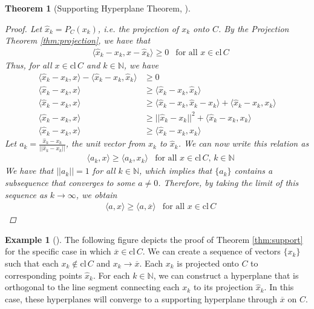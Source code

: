\documentclass[11pt,reqno]{amsart}
\newcommand{\N}{\mathbb{N}}
\newcommand{\cl}{\mathrm{cl\,}}
\theoremstyle{plain}
\newtheorem{maintheorem}{Theorem}
\theoremstyle{definition}
\newtheorem{example}[theorem]{Example}
\begin{document}
{\begin{maintheorem}[{Supporting Hyperplane Theorem, \cite[1.5.1]{bertsekas2009convex}}]
\begin{proof}
        Let $\hat{x}_k = P_C(x_k)$, \emph{i.e.} the projection of $x_k$ onto $C$. By the Projection Theorem \ref{thm:projection}, we have that
        \begin{align*}
            &\langle \hat{x}_k - x_k, x - \hat{x}_k\rangle \geq 0 & \text{for all $x\in\cl C$}
        \end{align*}
        Thus, for all $x\in\cl C$ and $k\in\N$, we have
        \begin{align*}
            \langle \hat{x}_k - x_k, x\rangle -\langle \hat{x}_k - x_k,\hat{x}_k\rangle &\geq 0\\
            \langle \hat{x}_k - x_k, x\rangle &\geq \langle \hat{x}_k - x_k,\hat{x}_k\rangle\\
            \langle \hat{x}_k - x_k, x\rangle &\geq \langle \hat{x}_k - x_k,\hat{x}_k-x_k\rangle + \langle \hat{x}_k - x_k,x_k\rangle\\
            \langle \hat{x}_k - x_k, x\rangle &\geq ||\hat{x}_k - x_k||^2 + \langle \hat{x}_k - x_k,x_k\rangle\\
            \langle \hat{x}_k - x_k, x\rangle &\geq \langle \hat{x}_k - x_k,x_k\rangle
        \end{align*}
        Let $a_k = \frac{\hat{x}_k-x_k}{||\hat{x}_k-x_k||}$, the unit vector from $x_k$ to $\hat{x}_k$. We can now write this relation as
        \begin{align*}
            &\langle a_k,x\rangle \geq \langle a_k,x_k\rangle &\text{for all $x\in\cl C$, $k\in\N$}
        \end{align*}
        We have that $||a_k||=1$ for all $k\in\N$, which implies that $\{a_k\}$ contains a subsequence that converges to some $a\neq 0$. Therefore, by taking the limit of this sequence as $k\rightarrow\infty$, we obtain
        \begin{align*}
            &\langle a,x\rangle \geq \langle a,\overline{x}\rangle &\text{for all $x\in\cl C$}
        \end{align*}
    \end{proof}
\end{maintheorem}
\smallskip
\begin{example}[{\cite[1.5.3]{bertsekas2009convex}}]
    The following figure depicts the proof of Theorem \ref{thm:support} for the specific case in which $\overline{x}\in\cl C$. We can create a sequence of vectors $\{x_k\}$ such that each $x_k\notin\cl C$ and $x_k\rightarrow \overline{x}$. Each $x_k$ is projected onto $C$ to corresponding points $\hat{x}_k$. For each $k\in\N$, we can construct a hyperplane that is orthogonal to the line segment connecting each $x_k$ to its projection $\hat{x}_k$. In this case, these hyperplanes will converge to a supporting hyperplane through $\overline{x}$ on $C$.

\end{example}}
\end{document}

